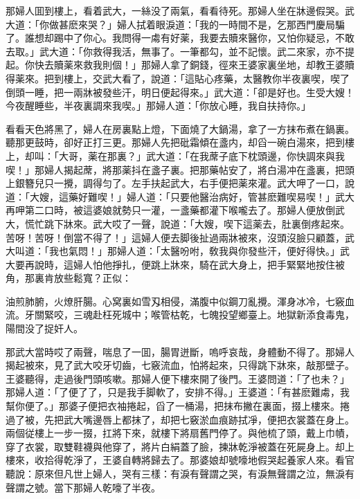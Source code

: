 那婦人囬到樓上，看着武大，一絲没了兩氣，看看待死。那婦人坐在牀邊假哭。武大道：「你做甚麽來哭？」婦人拭着眼淚道：「我的一時間不是，乞那西門慶局騙了。誰想却踢中了你心。我問得一䖏有好薬，我要去贖來醫你，又怕你疑忌，不敢去取。」武大道：「你救得我活，無事了。一筆都勾，並不記懷。武二來家，亦不提起。你快去贖薬來救我則個！」那婦人拿了銅錢，徑來王婆家裏坐地，却教王婆贖得薬來。把到樓上，交武大看了，說道：「這貼心疼藥，太醫教你半夜裏喫，喫了倒頭一睡，把一兩牀被發些汗，明日便起得來。」武大道：「卻是好也。生受大嫂！今夜醒睡些，半夜裏調來我喫。」那婦人道：「你放心睡，我自扶持你。」

看看天色將黑了，婦人在房裏點上燈，下面燒了大鍋湯，拿了一方抹布煮在鍋裏。聽那更鼓時，卻好正打三更。那婦人先把砒霜傾在盞内，却舀一碗白湯來，把到樓上，却叫：「大哥，薬在那裏？」武大道：「在我蓆子底下枕頭邊，你快調來與我喫！」那婦人揭起蓆，將那薬抖在盞子裏。把那藥帖安了，將白湯冲在盞裏，把頭上銀簪兒只一攪，調得匀了。左手扶起武大，右手便把薬來灌。武大呷了一口，說道：「大嫂，這藥好難喫！」婦人道：「只要他醫治病好，管甚麽難喫易喫！」武大再呷第二口時，被這婆娘就勢只一灌，一盞藥都灌下喉嚨去了。那婦人便放倒武大，慌忙跳下牀來。武大哎了一聲，說道：「大嫂，喫下這薬去，肚裏倒疼起來。苦呀！苦呀！倒當不得了！」這婦人便去脚後扯過兩牀被來，沒頭沒臉只顧蓋，武大叫道：「我也氣悶！」那婦人道：「太醫吩咐，敎我與你發些汗，便好得快。」武大要再說時，這婦人怕他掙扎，便跳上牀來，騎在武大身上，把手緊緊地按住被角，那裏肯放些鬆寬？正似：
\begin{myquote}
油煎肺腑，火燎肝腸。心窝裏如雪刄相侵，滿腹中似鋼刀亂攪。渾身冰冷，七竅血流。牙關緊咬，三魂赴枉死城中；喉管枯乾，七魄投望鄉臺上。地獄新添食毒鬼，陽間没了捉奸人。
\end{myquote}

那武大當時哎了兩聲，喘息了一囬，腸胃迸斷，嗚呼哀哉，身體動不得了。那婦人揭起被來，見了武大咬牙切齒，七竅流血，怕將起來，只得跳下牀來，敲那壁子。王婆聽得，走過後門頭咳嗽。那婦人便下樓來開了後門。王婆問道：「了也未？」那婦人道：「了便了了，只是我手脚軟了，安排不得。」王婆道：「有甚麽難䖏，我幫你便了。」那婆子便把衣袖捲起，舀了一桶湯，把抹布撇在裏面，掇上樓來。捲過了被，先把武大嘴邊唇上都抹了，却把七竅淤血痕跡拭凈，便把衣裳蓋在身上。兩個従樓上一步一掇，扛將下來，就樓下將扇舊門停了。與他梳了頭，戴上巾幘，穿了衣裳，取雙鞋襪與他穿了，將片白絹蓋了臉，揀牀乾淨被蓋在死屍身上。却上樓來，收拾得乾淨了，王婆自轉將歸去了。那婆娘却號嚎地假哭起養家人來。看官聽說：原來但凡世上婦人，哭有三樣：有淚有聲謂之哭，有淚無聲謂之泣，無淚有聲謂之號。當下那婦人乾嚎了半夜。

